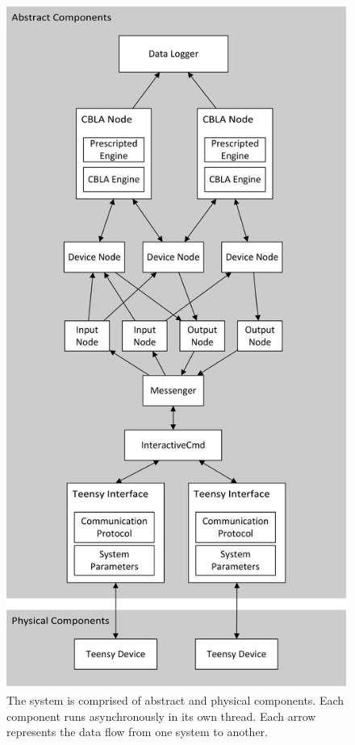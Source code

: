 \begin{figure} [!htbp]
	\centering
	\includegraphics[height=0.90 \textheight]{"fig/interactive control system/high-level system architecture"}
	\caption[High-level system architecture]{The system is comprised of abstract and physical components. Each component runs asynchronously in its own thread. Each arrow represents the data flow from one system to another.}
	\label{fig:system-architecture}
\end{figure}

